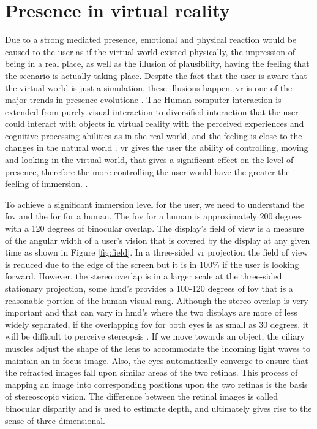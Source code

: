 \section{Presence in virtual reality} 
Due to a strong mediated presence, emotional and physical reaction would be caused to the user as if the virtual world existed physically, the impression of being in a real place, as well as the illusion of plausibility, having the feeling that the scenario is actually taking place. Despite the fact that the user is aware that the virtual world is just a simulation, these illusions happen. \acrshort{vr} is one of the major trends in presence evolutione \citep{Waterworth2014, Steinicke2016}.
The Human-computer interaction is extended from purely visual interaction to diversified interaction that the user could interact with objects in virtual reality with the perceived experiences and cognitive processing abilities as in the real world, and the feeling is close to the changes in the natural world \citep{Hu2016}.
\acrshort{vr} gives the user the ability of controlling, moving and looking in the virtual world, that gives a significant effect on the level of presence, therefore the more controlling the user would have the greater the feeling of immersion\citep{William}. \cite[p.4]{Waterworth2014}.


To achieve a significant immersion level for the user, we need to understand the \acrfull{fov} and the \acrfull{for} for a human. The \acrshort{fov} for a human is approximately 200 degrees with a 120 degrees of binocular overlap. The display's field of view is a measure of the angular width of a user's vision that is covered by the display at any given time as shown in Figure \ref{fig:field}. In a three-sided \acrshort{vr} projection the field of view is reduced due to the edge of the screen but it is in 100\% if the user is looking forward. However, the stereo overlap is in a larger scale at the three-sided stationary projection, some \acrlong{hmd}'s provides a 100-120 degrees of \acrshort{fov} that is a reasonable portion of the human visual rang. Although the stereo overlap is very important and that can vary in \acrshort{hmd}'s where the two displays are more of less widely separated, if the overlapping  
\acrshort{fov} for both eyes is as small as 30 degrees, it will be difficult to perceive stereopsis \citep{William}.
If we move towards an object, the ciliary muscles adjust the shape of the lens to accommodate
the incoming light waves to maintain an in-focus image. Also, the eyes automatically
converge to ensure that the refracted images fall upon similar areas of the
two retinas. This process of mapping an image into corresponding positions upon the
two retinas is the basis of stereoscopic vision. The difference between the retinal images
is called binocular disparity and is used to estimate depth, and ultimately gives rise to
the sense of three dimensional\citep{Vince2011}.

